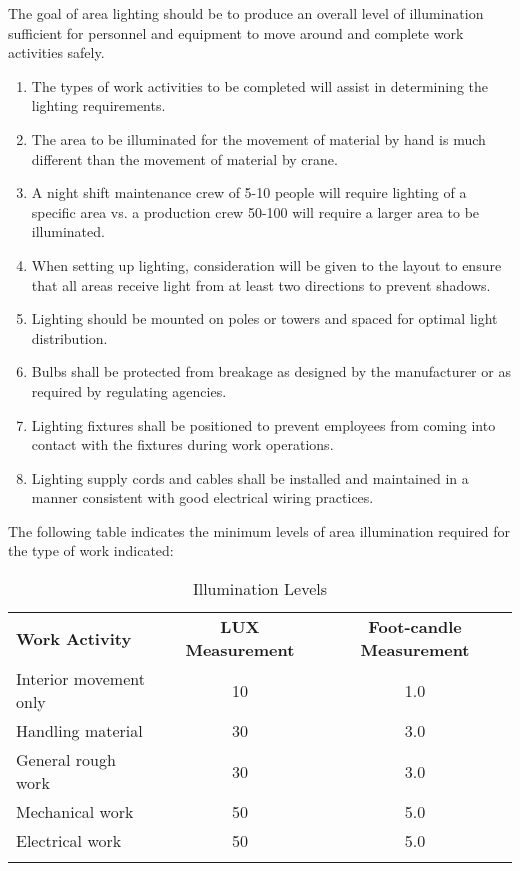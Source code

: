 The goal of area lighting should be to produce an overall level of illumination sufficient for personnel and equipment to move around and complete work activities safely.
\begin{enumerate}
\item {The types of work activities to be completed will assist in determining the lighting requirements.}
\item {The area to be illuminated for the movement of material by hand is much different than the movement of material by crane.}
\item {A night shift maintenance crew of 5-10 people will require lighting of a specific area vs. a production crew 50-100 will require a larger area to be illuminated.}
\item{When setting up lighting, consideration will be given to the layout to ensure that all areas receive light from at least two directions to prevent shadows.}
\item{Lighting should be mounted on poles or towers and spaced for optimal light distribution.}
\item{Bulbs shall be protected from breakage as designed by the manufacturer or as required by regulating agencies.}
\item{Lighting fixtures shall be positioned to prevent employees from coming into contact with the fixtures during work operations.}
\item{Lighting supply cords and cables shall be installed and maintained in a manner consistent with good electrical wiring practices.}
\end{enumerate}

The following table indicates the minimum levels of area illumination required for the type of work indicated:

\begin{table}
\begin{center}
\begin{tabular}{|l| c|c|}
\noalign{}\hline
\bf {Work Activity} & \bf{LUX Measurement} & \bf{Foot-candle Measurement} \\
\noalign{}\hline
Interior movement only &10 &1.0\\
\noalign{}\hline
Handling material &30 & 3.0\\
\noalign{}\hline
General rough work &30 &3.0\\
\noalign{}\hline
Mechanical work &50 &5.0\\
\noalign{}\hline
Electrical work &50 &5.0\\
\noalign{}\hline
\end{tabular}
\caption{Illumination Levels}
\end{center}
\end{table}


